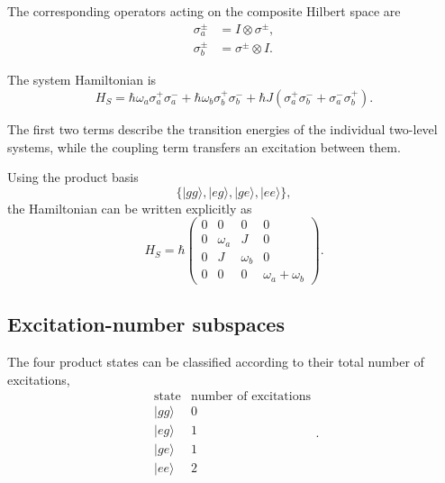 \documentclass[11pt]{article}
\begin{document}
The corresponding operators acting on the composite Hilbert space are
%
\begin{align}
\sigma_a^\pm
&=
I\otimes\sigma^\pm,
\\
\sigma_b^\pm
&=
\sigma^\pm\otimes I.
\end{align}

The system Hamiltonian is
%
\begin{equation}
\boxed{
H_S
=
\hbar\omega_a
\sigma_a^+\sigma_a^-
+
\hbar\omega_b
\sigma_b^+\sigma_b^-
+
\hbar J
\left(
\sigma_a^+\sigma_b^-
+
\sigma_a^-\sigma_b^+
\right).
}
\label{eq:dimer_hamiltonian}
\end{equation}

The first two terms describe the transition energies of the individual
two-level systems, while the coupling term transfers an excitation
between them.

Using the product basis
%
\begin{equation}
\{
|gg\rangle,
|eg\rangle,
|ge\rangle,
|ee\rangle
\},
\end{equation}
%
the Hamiltonian can be written explicitly as
%
\begin{equation}
\boxed{
H_S
=
\hbar
\begin{pmatrix}
0 & 0 & 0 & 0
\\
0 & \omega_a & J & 0
\\
0 & J & \omega_b & 0
\\
0 & 0 & 0 & \omega_a+\omega_b
\end{pmatrix}.
}
\label{eq:dimer_hamiltonian_matrix}
\end{equation}


\subsection{Excitation-number subspaces}

The four product states can be classified according to their total
number of excitations,
%
\begin{equation}
\begin{array}{c|c}
\text{state} & \text{number of excitations}
\\
\hline
|gg\rangle & 0
\\
|eg\rangle & 1
\\
|ge\rangle & 1
\\
|ee\rangle & 2
\end{array}.
\end{equation}
\end{document}
